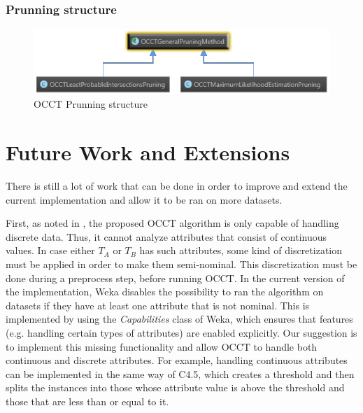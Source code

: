 \documentclass[a4paper,12pt]{article}
\begin{document}
\begin{spacing}{1.5}
\subsubsection{Prunning structure}
\begin{figure}[!h]
    \centering
\includegraphics[width=1\textwidth]{Figures/OCCTPruneStructure}
    \caption{OCCT Prunning structure}
    \label{fig:prunestr}
\end{figure}


\section{Future Work and Extensions}

There is still a lot of work that can be done in order to improve and extend the current implementation and allow it to be ran on more datasets.

First, as noted in \cite{dror2011thesis}, the proposed OCCT algorithm is only capable of handling discrete data. Thus, it cannot analyze attributes that consist of continuous values. In case either $T_A$ or $T_B$ has such attributes, some kind of discretization must be applied in order to make them semi-nominal. This discretization must be done during a preprocess step, before running OCCT. In the current version of the implementation, Weka disables the possibility to ran the algorithm on datasets if they have at least one attribute that is not nominal. This is implemented by using the {\em Capabilities} class of Weka, which ensures that features (e.g. handling certain types of attributes) are enabled explicitly. Our suggestion is to implement this missing functionality and allow OCCT to handle both continuous and discrete attributes. For example, handling continuous attributes can be implemented in the same way of C4.5, which creates a threshold and then splits the instances into those whose attribute value is above the threshold and those that are less than or equal to it.


\end{spacing}
\end{document}
